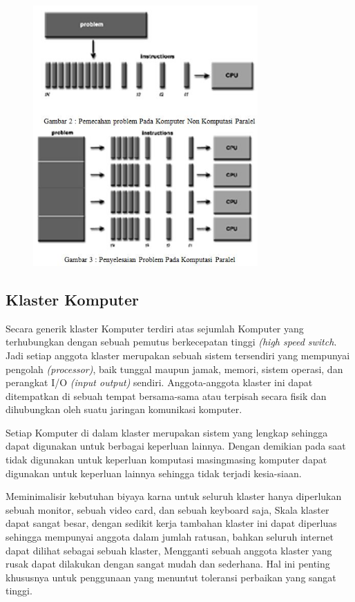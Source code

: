 \documentclass{jtetiproposalskripsi}
\begin{document}
\begin{figure}
\centering
  \includegraphics[height=10cm]{gambar/problem}
\end{figure}
  
 
\subsection{Klaster Komputer}
Secara generik klaster Komputer terdiri atas sejumlah Komputer yang terhubungkan dengan sebuah pemutus berkecepatan tinggi \emph{(high speed switch}. Jadi setiap anggota klaster merupakan sebuah sistem tersendiri yang mempunyai pengolah \emph{(processor)}, baik tunggal maupun jamak, memori, sistem operasi, dan perangkat I/O \emph{(input output)} sendiri. Anggota-anggota klaster ini dapat ditempatkan di sebuah tempat bersama-sama atau terpisah secara fisik dan dihubungkan oleh suatu jaringan komunikasi komputer. 

Setiap Komputer di dalam klaster merupakan sistem yang 		 lengkap sehingga dapat digunakan untuk berbagai keperluan lainnya. Dengan demikian pada saat tidak digunakan untuk keperluan komputasi  masingmasing komputer dapat digunakan untuk keperluan lainnya sehingga tidak terjadi kesia-siaan.

Meminimalisir kebutuhan biyaya karna untuk seluruh klaster hanya diperlukan sebuah monitor, sebuah video card, dan sebuah keyboard saja, Skala klaster dapat sangat besar, dengan sedikit kerja tambahan klaster ini dapat diperluas sehingga mempunyai anggota dalam jumlah ratusan, bahkan seluruh internet dapat dilihat sebagai sebuah klaster, Mengganti sebuah anggota klaster yang rusak dapat dilakukan dengan sangat mudah dan sederhana. Hal ini penting khususnya untuk penggunaan yang menuntut toleransi perbaikan yang sangat tinggi.
\end{document}
